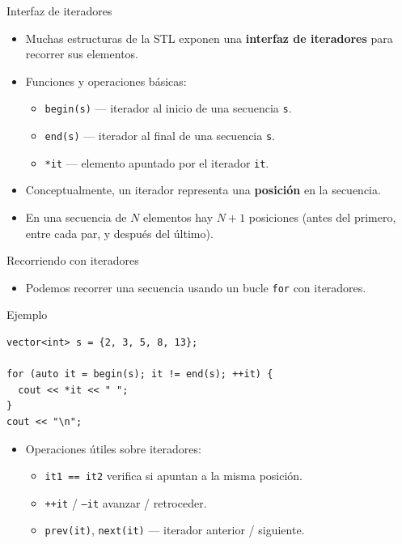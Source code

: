 \documentclass[aspectratio=169]{beamer}
\begin{document}
\begin{frame}{Interfaz de iteradores}
  \begin{itemize}
    \item Muchas estructuras de la STL exponen una \textbf{interfaz de iteradores} para recorrer sus elementos.
    \item Funciones y operaciones básicas:
      \begin{itemize}
        \item \texttt{begin(s)} — iterador al inicio de una secuencia \texttt{s}.
        \item \texttt{end(s)} — iterador al final de una secuencia \texttt{s}.
        \item \texttt{*it} — elemento apuntado por el iterador \texttt{it}.
      \end{itemize}
    \item Conceptualmente, un iterador representa una \textbf{posición} en la secuencia.
    \item En una secuencia de \(N\) elementos hay \(N+1\) posiciones (antes del primero, entre cada par, y después del último).
  \end{itemize}
\end{frame}

\begin{frame}[fragile]{Recorriendo con iteradores}
  \begin{itemize}
    \item Podemos recorrer una secuencia usando un bucle \texttt{for} con iteradores.
  \end{itemize}
  \begin{block}{Ejemplo}
  \begin{lstlisting}[style=customc]
vector<int> s = {2, 3, 5, 8, 13};

for (auto it = begin(s); it != end(s); ++it) {
  cout << *it << " ";
}
cout << "\n";
  \end{lstlisting}
  \end{block}
  \begin{itemize}
    \item Operaciones útiles sobre iteradores:
      \begin{itemize}
        \item \texttt{it1 == it2} verifica si apuntan a la misma posición.
        \item \texttt{++it} / \texttt{--it} avanzar / retroceder.
        \item \texttt{prev(it)}, \texttt{next(it)} — iterador anterior / siguiente.
      \end{itemize}
  \end{itemize}
\end{frame}
\end{document}
